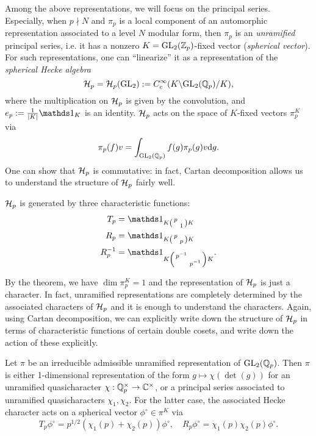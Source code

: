 Among the above representations, we will focus on the principal series.
Especially, when $p \nmid N$ and $\pi_p$ is a local component of an automorphic representation associated to a level $N$ modular form, then $\pi_p$ is an \emph{unramified} principal series, i.e. it has a nonzero $K = \mathrm{GL}_2(\mathbb{Z}_p)$-fixed vector (\emph{spherical vector}).
For such representations, one can ``linearize'' it as a representation of the \emph{spherical Hecke algebra}
$$
\mathcal{H}_p = \mathcal{H}_p(\mathrm{GL}_2) := C_c^\infty(K \backslash \mathrm{GL}_2(\mathbb{Q}_p) / K),
$$
where the multiplication on $\mathcal{H}_p$ is given by the convolution, and $e_p := \frac{1}{|K|} \dso_{K}$ is an identity.
$\mathcal{H}_p$ acts on the space of $K$-fixed vectors $\pi_p^K$ via
$$
\pi_p(f)v = \int_{\mathrm{GL}_2(\mathbb{Q}_p)} f(g)\pi_p(g)v \mathrm{d} g.
$$
One can show that $\mathcal{H}_p$ is commutative: in fact, Cartan decomposition allows us to understand the structure of $\mathcal{H}_p$ fairly well.
\begin{theorem}
$\mathcal{H}_p$ is generated by three characteristic functions:
\begin{align*}
    T_p &= \dso_{K \left(\begin{smallmatrix} p & \\ & 1 \end{smallmatrix}\right) K} \\
    R_p &= \dso_{K \left(\begin{smallmatrix} p & \\ & p \end{smallmatrix}\right) K} \\
    R_p^{-1} &= \dso_{K \left(\begin{smallmatrix} p^{-1} & \\ & p^{-1} \end{smallmatrix}\right) K} .
\end{align*}
\end{theorem}
By the theorem, we have $\dim \pi_p^{K} = 1$ and the representation of $\mathcal{H}_p$ is just a character.
In fact, unramified representations are completely determined by the associated characters of $\mathcal{H}_p$ and it is enough to understand the characters.
Again, using Cartan decomposition, we can explicitly write down the structure of $\mathcal{H}_p$ in terms of characteristic functions of certain double cosets, and write down the action of these explicitly.


\begin{theorem}
Let $\pi$ be an irreducible admissible unramified representation of $\mathrm{GL}_2(\mathbb{Q}_p)$. Then $\pi$ is either 1-dimensional representation of the form $g \mapsto \chi(\det(g))$ for an unramified quasicharacter $\chi: \mathbb{Q}_p^\times \to \mathbb{C}^\times$, or a principal series associated to unramified quasicharacters $\chi_1, \chi_2$.
For the latter case, the associated Hecke character acts on a spherical vector $\phi^\circ \in \pi^{K}$ via
$$
T_p \phi^\circ = p^{1/2}(\chi_1(p) + \chi_2(p)) \phi^\circ, \quad R_p \phi^\circ = \chi_1(p) \chi_2(p) \phi^\circ.
$$
\end{theorem}

